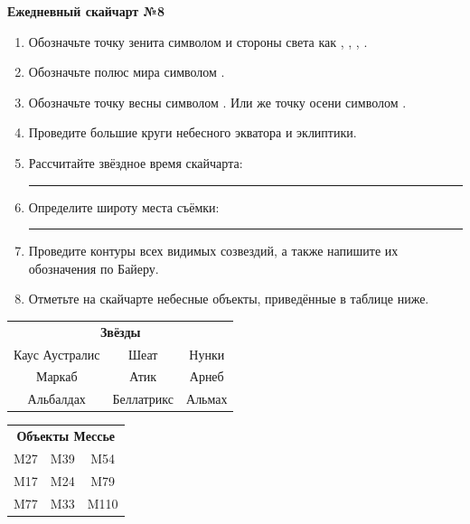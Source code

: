 \documentclass{./SAS-class-skygen}
\begin{document}
    
    
    
	\begin{center}
		\large\textbf{Ежедневный скайчарт №8}
	\end{center}

	\begin{enumerate}
		\item Обозначьте точку зенита символом  и стороны света как , , , .
		\item Обозначьте полюс мира символом .
		\item Обозначьте точку весны символом \Aries. Или же точку осени символом \Libra.
		\item Проведите большие круги небесного экватора и эклиптики.
		\item Рассчитайте звёздное время скайчарта: \rule{2cm}{0.4pt}
		\item Определите широту места съёмки: \rule{2cm}{0.4pt}
		\item Проведите контуры всех видимых созвездий, а также напишите их обозначения по Байеру.
		\item Отметьте на скайчарте небесные объекты, приведённые в таблице ниже.
	\end{enumerate}
	
    \vspace{0.5cm}

    \begin{table}[h!]
    \centering
    \begin{tabular}{ccc}
    \multicolumn{3}{c}{\textbf{Звёзды}} \\ Каус Аустралис & Шеат & Нунки \\
Маркаб & Атик & Арнеб \\
Альбалдах & Беллатрикс & Альмах \\

\end{tabular}
    \hfill
    \begin{tabular}{ccc}
    \multicolumn{3}{c}{\textbf{Объекты Мессье}} \\ M27 & M39 & M54 \\
M17 & M24 & M79 \\
M77 & M33 & M110 \\

\end{tabular}
    \end{table}
	
\end{document}
